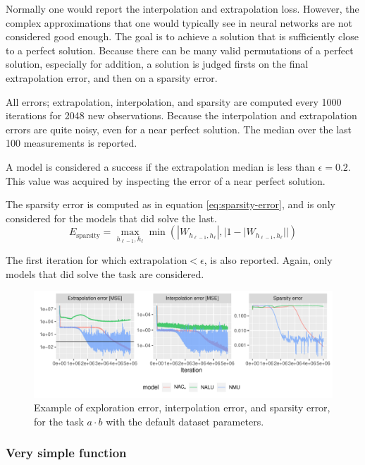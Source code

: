 Normally one would report the interpolation and extrapolation loss. However, the complex approximations that one would typically see in neural networks are not considered good enough. The goal is to achieve a solution that is sufficiently close to a perfect solution. Because there can be many valid permutations of a perfect solution, especially for addition, a solution is judged firsts on the final extrapolation error, and then on a sparsity error.

All errors; extrapolation, interpolation, and sparsity are computed every 1000 iterations for 2048 new observations. Because the interpolation and extrapolation errors are quite noisy, even for a near perfect solution. The median over the last 100 measurements is reported.

A model is considered a success if the extrapolation median is less than $\epsilon = 0.2$. This value was acquired by inspecting the error of a near perfect solution. 

The sparsity error is computed as in equation \ref{eq:sparsity-error}, and is only considered for the models that did solve the last.
\begin{equation}
E_\mathrm{sparsity} = \max_{h_{\ell-1}, h_{\ell}} \min(|W_{h_{\ell-1},h_\ell}|, |1 - |W_{h_{\ell-1},h_\ell}||)
\label{eq:sparsity-error}
\end{equation}

The first iteration for which $\mathrm{extrapolation} < \epsilon$, is also reported. Again, only models that did solve the task are considered.

\begin{figure}[H]
\centering
\includegraphics[width=\linewidth]{paper/results/function-task-static-example.pdf}
\caption{Example of exploration error, interpolation error, and sparsity error, for the task $a \cdot b$ with the default dataset parameters.}
\end{figure}

\subsubsection{Very simple function}

